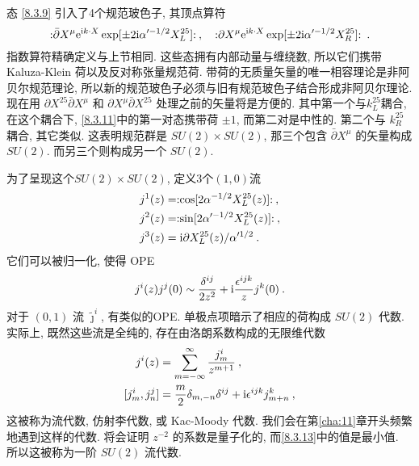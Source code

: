 态 \eqref{8.3.9} 引入了4个规范玻色子, 其顶点算符
\begin{equation}
	: \mathrel{\bar{\partial} X^{\mu} \mathrm{e}^{\mathrm{i} k \cdot X} \exp [\pm 2 \mathrm{i} \alpha^{\prime-1 / 2} X_{L}^{25}]}: \:, \quad 
	: \mathrel{ \partial X^{\mu} \mathrm{e}^{\mathrm{i} k \cdot X} \exp [\pm 2 \mathrm{i} \alpha^{\prime-1 / 2} X_{R}^{25}]}: \:. \label{8.3.11}
\end{equation}
指数算符精确定义与上节相同. 这些态拥有内部动量与缠绕数, 所以它们携带 Kaluza-Klein 荷以及反对称张量规范荷. 带荷的无质量矢量的唯一相容理论是非阿贝尔规范理论, 
所以新的规范玻色子必须与旧有规范玻色子结合形成非阿贝尔理论. 现在用 $\partial X^{25} \bar{\partial} X^{\mu}$ 和 $\partial X^{\mu} \bar{\partial} X^{25}$ 处理之前的矢量将是方便的. 其中第一个与$k_{L}^{25}$耦合, 在这个耦合下, \eqref{8.3.11}中的第一对态携带荷 $\pm 1$, 而第二对是中性的. 
第二个与 $k_{R}^{25}$ 耦合, 其它类似. 这表明规范群是 $S U(2) \times S U(2)$, 那三个包含 $\bar{\partial} X^{\mu}$ 的矢量构成 $S U(2)$. 
而另三个则构成另一个 $S U(2)$. 

为了呈现这个$S U(2) \times S U(2)$, 定义3个$(1,0)$流
\begin{subequations} \label{8.3.12}
\begin{align}
j^{1}(z)&=: \mathrel{\cos [2 \alpha^{-1 / 2} X_{L}^{25}(z)]}: \:, \label{8.3.12a}  \\
j^{2}(z)&=:\mathrel{ \sin [2 \alpha^{\prime-1 / 2} X_{L}^{25}(z)]}: \:, \label{8.3.12b} \\
j^{3}(z)&=\mathrm{i} \partial X_{L}^{25}(z) / \alpha^{\prime 1 / 2} \:. \label{8.3.12c}
\end{align}
\end{subequations}
它们可以被归一化, 使得 OPE
\begin{equation}
	j^{i}(z) j^{j}(0) \sim \frac{\delta^{i j}}{2 z^{2}}+ \mathrm{i} \frac{\epsilon^{i j k}}{z} j^{k}(0) \:. \label{8.3.13}
\end{equation}
对于 $(0,1)$ 流 $\tilde{\jmath}^{i} $, 有类似的OPE. 单极点项暗示了相应的荷构成 $SU(2)$ 代数. 实际上, 既然这些流是全纯的, 存在由洛朗系数构成的无限维代数
\begin{subequations} \label{8.3.14}
\begin{align}
		j^{i}(z) &= \sum_{m=-\infty}^{\infty} \frac{j_{m}^{i}}{z^{m+1}}  \:, \label{8.3.14a} \\
		[j_{m}^{i}, j_{n}^{j}] &= \frac{m}{2} \delta_{m,-n} \delta^{i j}+ \mathrm{i} \epsilon^{i j k} j_{m+n}^{k} \:, \label{8.3.14b} 
\end{align}
\end{subequations}
这被称为流代数, 仿射李代数, 或 Kac-Moody 代数. 我们会在第\ref{cha:11}章开头频繁地遇到这样的代数. 将会证明 $z^{-2}$ 的系数是量子化的, 
而\eqref{8.3.13}中的值是最小值. 所以这被称为一阶 $SU(2)$ 流代数.


